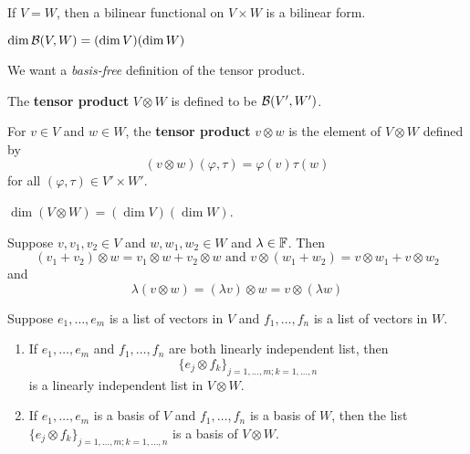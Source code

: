\documentclass{extarticle}
\begin{document}
\begin{remark}
    If \(V = W\), then a bilinear functional on \(V \times W\) is a bilinear form.
\end{remark}

\begin{corollary}
    \(\dim \mathcal{B}(V, W) = (\dim V) ( \dim W)\)
\end{corollary}

\begin{remark}
    We want a \emph{basis-free} definition of the tensor product. 
\end{remark}

\begin{definition}
    The \textbf{tensor product} \(V \otimes W\) is defined to be \(\mathcal{B}(V', W')\). 

    For \(v \in V\) and \(w \in W\), the \textbf{tensor product} \(v \otimes w\) is the element 
    of \(V \otimes W\) defined by 
    \[(v \otimes w)(\varphi, \tau) = \varphi (v) \tau(w)\]
    for all \((\varphi, \tau) \in V' \times W'\). 
\end{definition}

\begin{corollary}
    \(\dim (V \otimes W) = (\dim V) (\dim W)\).
\end{corollary}

\begin{proposition}
    Suppose \(v, v_1, v_2 \in V\) and \(w, w_1, w_2 \in W\) and \(\lambda \in \mathbb{F}\). Then 
    \[(v_1 + v_2) \otimes w = v_1 \otimes w + v_2 \otimes w \text{   and   }
    v \otimes (w_1 +w_2) = v \otimes w_1 + v \otimes w_2\]
    and 
    \[\lambda \left( v \otimes w \right) = (\lambda v) \otimes w = v \otimes \left( \lambda w \right)\] 
\end{proposition}

\begin{thm}
    Suppose \(e_1, \ldots, e_m\) is a list of vectors in \(V\) and \(f_1, \ldots, f_n\) is a list 
    of vectors in \(W\). 

    \begin{enumerate}[label=(\alph*)]
        \item If \(e_1, \ldots, e_m\) and \(f_1, \ldots, f_n\) are both linearly independent list, then 
        \[\{e_j \otimes f_k\}_{j= 1, \ldots, m ; k = 1, \ldots, n}\]
        is a linearly independent list in \(V \otimes W\).

        \item If \(e_1, \ldots, e_m\) is a basis of \(V\) and \(f_1, \ldots, f_n\) is a basis of \(W\), then 
        the list \(\{e_j \otimes f_k\}_{j=1, \ldots, m; k = 1, \ldots, n}\) is a basis of \(V \otimes W\). 
    \end{enumerate}
\end{thm}
\end{document}
